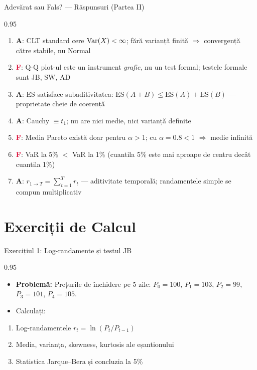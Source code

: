 \documentclass[9pt, aspectratio=169, t]{beamer}
\begin{document}
\begin{frame}{Adevărat sau Fals? --- Răspunsuri (Partea II)}
\begin{cminipage}{0.95\textwidth}
    \footnotesize
    \begin{enumerate}\setlength{\itemsep}{1pt}
        \setcounter{enumi}{7}
        \item \textcolor{Forest}{\textbf{A}}: CLT standard cere $\text{Var}(X) < \infty$; fără varianță finită $\Rightarrow$ convergență către stabile, nu Normal
        \item \textcolor{Crimson}{\textbf{F}}: Q-Q plot-ul este un instrument \textit{grafic}, nu un test formal; testele formale sunt JB, SW, AD
        \item \textcolor{Forest}{\textbf{A}}: ES satisface subaditivitatea: $\text{ES}(A+B) \leq \text{ES}(A) + \text{ES}(B)$ --- proprietate cheie de coerență
        \item \textcolor{Forest}{\textbf{A}}: Cauchy $\equiv t_1$; nu are nici medie, nici varianță definite
        \item \textcolor{Crimson}{\textbf{F}}: Media Pareto există doar pentru $\alpha > 1$; cu $\alpha = 0.8 < 1$ $\Rightarrow$ medie infinită
        \item \textcolor{Crimson}{\textbf{F}}: VaR la 5\% $<$ VaR la 1\% (cuantila 5\% este mai aproape de centru decât cuantila 1\%)
        \item \textcolor{Forest}{\textbf{A}}: $r_{1 \to T} = \sum_{t=1}^T r_t$ --- aditivitate temporală; randamentele simple se compun multiplicativ
    \end{enumerate}
\end{cminipage}
\end{frame}

\section{Exerciții de Calcul}

\begin{frame}{Exercițiul 1: Log-randamente și testul JB}
\begin{cminipage}{0.95\textwidth}
    \begin{itemize}\setlength{\itemsep}{0pt}
        \item \textbf{Problemă:} Prețurile de închidere pe 5 zile: $P_0 = 100$, $P_1 = 103$, $P_2 = 99$, $P_3 = 101$, $P_4 = 105$.
        \item Calculați:
    \end{itemize}
    \begin{enumerate}\setlength{\itemsep}{0pt}
        \item Log-randamentele $r_t = \ln(P_t / P_{t-1})$
        \item Media, varianța, skewness, kurtosis ale eșantionului
        \item Statistica Jarque--Bera și concluzia la 5\%
    \end{enumerate}
\end{cminipage}
\end{frame}
\end{document}
